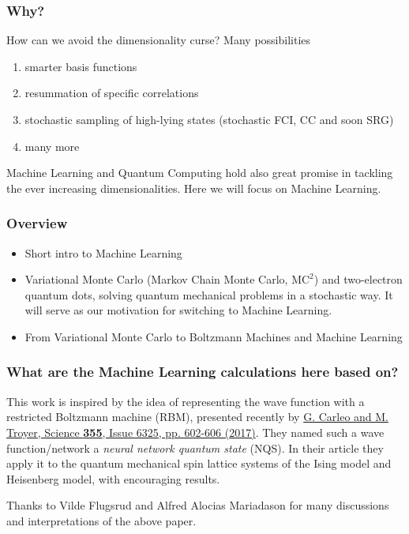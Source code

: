 \documentclass{beamer}
\begin{document}
\begin{frame}
\frametitle{Why?}

How can we avoid the dimensionality curse? Many possibilities
\begin{enumerate}
\item smarter basis functions

\item resummation of specific correlations

\item stochastic sampling of high-lying states (stochastic FCI, CC and soon SRG)

\item many more
\end{enumerate}

\noindent
Machine Learning and Quantum Computing hold also great promise in tackling the 
ever increasing dimensionalities. Here we will focus on Machine Learning.
\end{frame}

\begin{frame}
\frametitle{Overview}

\begin{block}{}
\begin{itemize}
\item Short intro to Machine Learning

\item Variational Monte Carlo (Markov Chain Monte Carlo, $\mathrm{MC}^2$) and two-electron quantum dots, solving quantum mechanical problems in a stochastic way. It  will serve as  our motivation for switching to Machine Learning. 

\item From Variational Monte Carlo to Boltzmann Machines and Machine Learning
\end{itemize}

\noindent
\end{block}
\end{frame}

\begin{frame}
\frametitle{What are the Machine Learning calculations here based on?}

This work is inspired by the idea of representing the wave function with
a restricted Boltzmann machine (RBM), presented recently by \href{{http://science.sciencemag.org/content/355/6325/602}}{G. Carleo and M. Troyer, Science \textbf{355}, Issue 6325, pp. 602-606 (2017)}. They
named such a wave function/network a \emph{neural network quantum state} (NQS). In their article they apply it to the quantum mechanical
spin lattice systems of the Ising model and Heisenberg model, with
encouraging results.

Thanks to Vilde Flugsrud and Alfred Alocias Mariadason for many discussions and interpretations of the above paper.
\end{frame}
\end{document}
